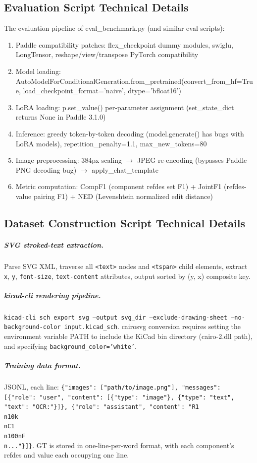 \subsection{Evaluation Script Technical Details}

The evaluation pipeline of eval\_benchmark.py (and similar eval scripts):

\begin{enumerate}[nosep]
    \item Paddle compatibility patches: flex\_checkpoint dummy modules, swiglu, LongTensor, reshape/view/transpose PyTorch compatibility
    \item Model loading: AutoModelForConditionalGeneration.from\_pretrained(convert\_from\_hf=True, load\_checkpoint\_format='naive', dtype='bfloat16')
    \item LoRA loading: p.set\_value() per-parameter assignment (set\_state\_dict returns None in Paddle 3.1.0)
    \item Inference: greedy token-by-token decoding (model.generate() has bugs with LoRA models), repetition\_penalty=1.1, max\_new\_tokens=80
    \item Image preprocessing: 384px scaling $\to$ JPEG re-encoding (bypasses Paddle PNG decoding bug) $\to$ apply\_chat\_template
    \item Metric computation: CompF1 (component refdes set F1) + JointF1 (refdes-value pairing F1) + NED (Levenshtein normalized edit distance)
\end{enumerate}

\subsection{Dataset Construction Script Technical Details}

\subparagraph{SVG stroked-text extraction.} Parse SVG XML, traverse all \texttt{<text>} nodes and \texttt{<tspan>} child elements, extract \texttt{x}, \texttt{y}, \texttt{font-size}, \texttt{text-content} attributes, output sorted by (y, x) composite key.

\subparagraph{kicad-cli rendering pipeline.} \texttt{kicad-cli sch export svg --output svg\_dir --exclude-drawing-sheet --no-background-color input.kicad\_sch}. cairosvg conversion requires setting the environment variable PATH to include the KiCad bin directory (cairo-2.dll path), and specifying \texttt{background\_color='white'}.

\subparagraph{Training data format.} JSONL, each line: \texttt{\{"images": ["path/to/image.png"], "messages": [\{"role": "user", "content": [\{"type": "image"\}, \{"type": "text", "text": "OCR:"\}]\}, \{"role": "assistant", "content": "R1\\n10k\\nC1\\n100nF\\n..."\}]\}}. GT is stored in one-line-per-word format, with each component's refdes and value each occupying one line.

